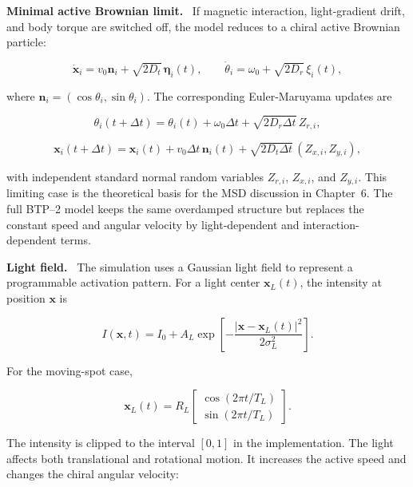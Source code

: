 \documentclass[12pt,a4paper,oneside]{report}
\newcommand{\runin}[1]{\vspace{0.45em}\noindent\textbf{#1.}\ }
\begin{document}
\runin{Minimal active Brownian limit}
If magnetic interaction, light-gradient drift, and body torque are switched off, the model reduces to a chiral active Brownian particle:

\begin{equation}
\dot{\mathbf{x}}_i=v_0\mathbf{n}_i+\sqrt{2D_t}\,\bm{\eta}_i(t),
\qquad
\dot{\theta}_i=\omega_0+\sqrt{2D_r}\,\xi_i(t),
\label{eq:minimalabp}
\end{equation}

where $\mathbf{n}_i=(\cos\theta_i,\sin\theta_i)$. The corresponding Euler-Maruyama updates are

\begin{equation}
\theta_i(t+\Delta t)=\theta_i(t)+\omega_0\Delta t+\sqrt{2D_r\Delta t}\,Z_{r,i},
\end{equation}

\begin{equation}
\mathbf{x}_i(t+\Delta t)=
\mathbf{x}_i(t)+v_0\Delta t\,\mathbf{n}_i(t)
+\sqrt{2D_t\Delta t}\,(Z_{x,i},Z_{y,i}),
\end{equation}

with independent standard normal random variables $Z_{r,i}$, $Z_{x,i}$, and $Z_{y,i}$. This limiting case is the theoretical basis for the MSD discussion in Chapter~6. The full BTP--2 model keeps the same overdamped structure but replaces the constant speed and angular velocity by light-dependent and interaction-dependent terms.

\runin{Light field}
The simulation uses a Gaussian light field to represent a programmable activation pattern. For a light center $\mathbf{x}_L(t)$, the intensity at position $\mathbf{x}$ is

\begin{equation}
I(\mathbf{x},t) = I_0 + A_L
\exp\left[-\frac{\left|\mathbf{x}-\mathbf{x}_L(t)\right|^2}{2\sigma_L^2}\right].
\end{equation}

For the moving-spot case,

\begin{equation}
\mathbf{x}_L(t) = R_L
\begin{bmatrix}
\cos(2\pi t/T_L) \\
\sin(2\pi t/T_L)
\end{bmatrix}.
\end{equation}

The intensity is clipped to the interval $[0,1]$ in the implementation. The light affects both translational and rotational motion. It increases the active speed and changes the chiral angular velocity:
\end{document}
